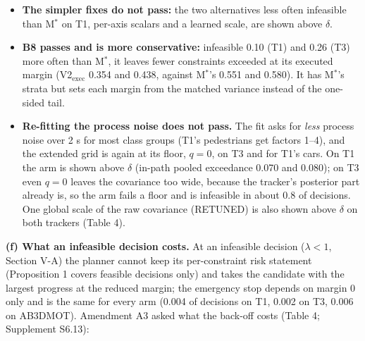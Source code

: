 \documentclass{ieeeaccess}
\begin{document}
\begin{itemize}
\item \textbf{The simpler fixes do not pass:} the two alternatives less often infeasible than M$^{*}$ on T1, per-axis scalars and a learned scale, are shown above $\delta$.
\item \textbf{B8 passes and is more conservative:} infeasible 0.10 (T1) and 0.26 (T3) more often than M$^{*}$, it leaves fewer constraints exceeded at its executed margin (V2$_{\mathrm{exec}}$ 0.354 and 0.438, against M$^{*}$'s 0.551 and 0.580). It has M$^{*}$'s strata but sets each margin from the matched variance instead of the one-sided tail.
\item \textbf{Re-fitting the process noise does not pass.} The fit asks for \emph{less} process noise over 2 s for most class groups (T1's pedestrians get factors 1--4), and the extended grid is again at its floor, $q = 0$, on T3 and for T1's cars. On T1 the arm is shown above $\delta$ (in-path pooled exceedance 0.070 and 0.080); on T3 even $q = 0$ leaves the covariance too wide, because the tracker's posterior part already is, so the arm fails a floor and is infeasible in about 0.8 of decisions. One global scale of the raw covariance (RETUNED) is also shown above $\delta$ on both trackers (Table 4).
\end{itemize}

\textbf{(f) What an infeasible decision costs.} At an infeasible decision ($\lambda < 1$, Section V-A) the planner cannot keep its per-constraint risk statement (Proposition 1 covers feasible decisions only) and takes the candidate with the largest progress at the reduced margin; the emergency stop depends on margin 0 only and is the same for every arm (0.004 of decisions on T1, 0.002 on T3, 0.006 on AB3DMOT). Amendment A3 asked what the back-off costs (Table 4; Supplement S6.13):
\end{document}
